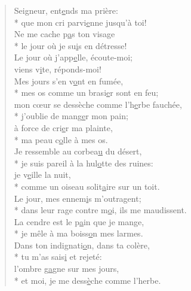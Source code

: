\begin{verse}

Seigneur, ent\underline{e}nds ma prière: \\*
que mon cri parvi\underline{e}nne jusqu’à toi! \\
Ne me cache p\underline{a}s ton visage \\*
le jour où je su\underline{i}s en détresse! \\
Le jour où j’app\underline{e}lle, écoute-moi; \\
viens v\underline{i}te, réponds-moi! \\

Mes jours s’en v\underline{o}nt en fumée, \\*
mes os comme un brasi\underline{e}r sont en feu; \\
mon cœur se dessèche comme l’h\underline{e}rbe fauchée, \\*
j’oublie de mang\underline{e}r mon pain; \\
à force de cri\underline{e}r ma plainte, \\*
ma peau c\underline{o}lle à mes os. \\

Je ressemble au corbea\underline{u} du désert, \\*
je suis pareil à la hul\underline{o}tte des ruines: \\
je v\underline{e}ille la nuit, \\*
comme un oiseau solit\underline{a}ire sur un toit. \\
Le jour, mes ennem\underline{i}s m’outragent; \\*
dans leur rage contre m\underline{o}i, ils me maudissent. \\

La cendre est le p\underline{a}in que je mange, \\*
je mêle à ma boiss\underline{o}n mes larmes. \\
Dans ton indignati\underline{o}n, dans ta colère, \\*
tu m’as sais\underline{i} et rejeté: \\
l’ombre g\underline{a}gne sur mes jours, \\*
et moi, je me dess\underline{è}che comme l’herbe. \\


\end{verse}
